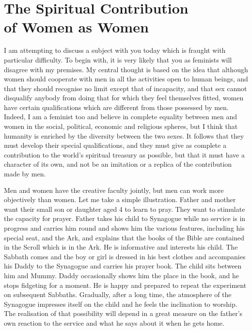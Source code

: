 \chapter[The Spiritual Contribution of Women as Women]{The Spiritual Contribution\\of Women as Women}

I am attempting to discuss a subject with you today
which is fraught with particular difficulty. To begin
with, it is very likely that you as feminists will disagree
with my premises. My central thought is based on the idea
that although women should cooperate with men in all the
activities open to human beings, and that they should
recognise no limit except that of incapacity, and that sex
cannot disqualify anybody from doing that for which they
feel themselves fitted, women have certain qualifications
which are different from those possessed by men. Indeed, I
am a feminist too and believe in complete equality between
men and women in the social, political, economic and religious
spheres, but I think that humanity is enriched by the
diversity between the two sexes. It follows that they must
develop their special qualifications, and they must give as
complete a contribution to the world's spiritual treasury
as possible, but that it must have a character of its own,
and not be an imitation or a replica of the contribution
made by men.

Men and women have the creative faculty jointly, but
men can work more objectively than women. Let me take a
simple illustration. Father and mother want their small
son or daughter aged 4 to learn to pray. They want to
stimulate the capacity for prayer. Father takes his child
to Synagogue while no service is in progress and carries
him round and shows him the various features, including his
special seat, and the Ark, and explains that the books of
the Bible are contained in the Scroll which is in the Ark.
He is informative and interests his child. The Sabbath
comes and the boy or girl is dressed in his best clothes
and accompanies his Daddy to the Synagogue and carries his
prayer book. The child sits between him and Mummy. Daddy
occasionally shows him the place in the book, and he stops
fidgeting for a moment. He is happy and prepared to repeat
the experiment on subsequent Sabbaths. Gradually, after a
long time, the atmosphere of the Synagogue impresses itself
on the child and he feels the inclination to worship. The
realisation of that possibility will depend in a great
measure on the father's own reaction to the service and
what he says about it when he gets home.

